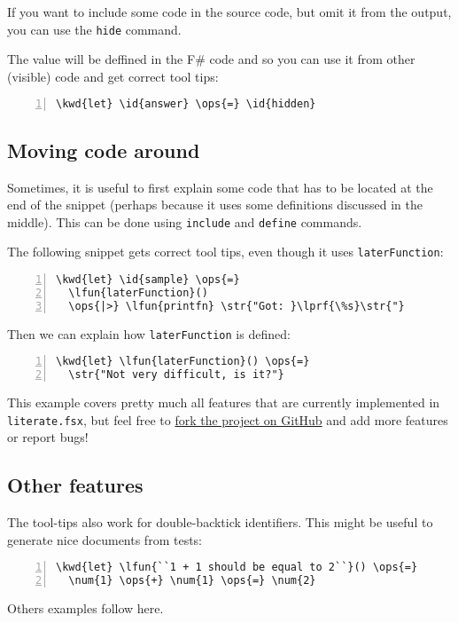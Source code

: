 \documentclass{article}
\newcommand{\id}[1]{\textcolor[HTML]{000000}{#1}}
\newcommand{\str}[1]{\textcolor[HTML]{A31515}{#1}}
\newcommand{\kwd}[1]{\textcolor[HTML]{0000FF}{#1}}
\newcommand{\ops}[1]{\textcolor[HTML]{000000}{#1}}
\newcommand{\num}[1]{\textcolor[HTML]{000000}{#1}}
\newcommand{\lfun}[1]{\textcolor[HTML]{0000A0}{#1}}
\newcommand{\lprf}[1]{\textcolor[HTML]{2B91AF}{#1}}
\begin{document}
If you want to include some code in the source code, 
but omit it from the output, you can use the \texttt{hide} 
command.


The value will be deffined in the F\# code and so you
can use it from other (visible) code and get correct
tool tips:
\begin{Verbatim}[commandchars=\\\{\}, numbers=left]
\kwd{let} \id{answer} \ops{=} \id{hidden}
\end{Verbatim}

\subsection*{Moving code around}



Sometimes, it is useful to first explain some code that
has to be located at the end of the snippet (perhaps 
because it uses some definitions discussed in the middle).
This can be done using \texttt{include} and \texttt{define} commands.


The following snippet gets correct tool tips, even though
it uses \texttt{laterFunction}:
\begin{Verbatim}[commandchars=\\\{\}, numbers=left]
\kwd{let} \id{sample} \ops{=} 
  \lfun{laterFunction}()
  \ops{|>} \lfun{printfn} \str{"Got: }\lprf{\%s}\str{"}
\end{Verbatim}



Then we can explain how \texttt{laterFunction} is defined:
\begin{Verbatim}[commandchars=\\\{\}, numbers=left]
\kwd{let} \lfun{laterFunction}() \ops{=} 
  \str{"Not very difficult, is it?"}
\end{Verbatim}



This example covers pretty much all features that are 
currently implemented in \texttt{literate.fsx}, but feel free 
to \href{https://github.com/tpetricek/FSharp.Formatting}{fork the project on GitHub} and add more 
features or report bugs!
\subsection*{Other features}



The tool-tips also work for double-backtick identifiers.
This might be useful to generate nice documents from tests:
\begin{Verbatim}[commandchars=\\\{\}, numbers=left]
\kwd{let} \lfun{``1 + 1 should be equal to 2``}() \ops{=}
  \num{1} \ops{+} \num{1} \ops{=} \num{2}
\end{Verbatim}



Others examples follow here.
\end{document}
